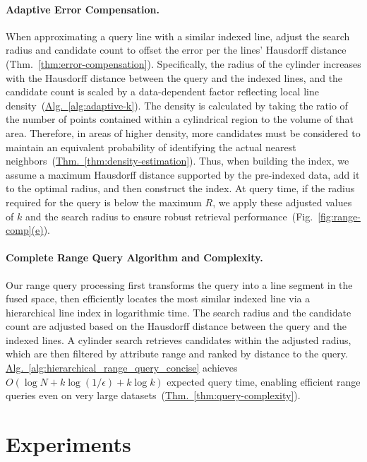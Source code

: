 \documentclass[numbers,sort]{article}
\begin{document}
\paragraph{Adaptive Error Compensation.}When approximating a query line with a similar indexed line, adjust the search radius and candidate count to offset the error per the lines’ Hausdorff distance (Thm.~\ref*{thm:error-compensation}). Specifically, the radius of the cylinder increases with the Hausdorff distance between the query and the indexed lines, and the candidate count is scaled by a data-dependent factor reflecting local line density~(\hyperref[alg:adaptive-k]{Alg.~\ref*{alg:adaptive-k}}). The density is calculated by taking the ratio of the number of points contained within a cylindrical region to the volume of that area. Therefore, in areas of higher density, more candidates must be considered to maintain an equivalent probability of identifying the actual nearest neighbors~(\hyperref[thm:density-estimation]{Thm.~\ref*{thm:density-estimation}}). Thus, when building the index, we assume a maximum Hausdorff distance supported by the pre-indexed data, add it to the optimal radius, and then construct the index. At query time, if the radius required for the query is below the maximum $R$, we apply these adjusted values of $k$ and the search radius to ensure robust retrieval performance~(Fig.~\hyperref[fig:range-comp]{\ref*{fig:range-comp}(e)}).
\paragraph{Complete Range Query Algorithm and Complexity.}Our range query processing first transforms the query into a line segment in the fused space, then efficiently locates the most similar indexed line via a hierarchical line index in logarithmic time. The search radius and the candidate count are adjusted based on the Hausdorff distance between the query and the indexed lines. A cylinder search retrieves candidates within the adjusted radius, which are then filtered by attribute range and ranked by distance to the query. \hyperref[alg:hierarchical_range_query_concise]{Alg.~\ref*{alg:hierarchical_range_query_concise}} achieves $O(\log N + k\log(1/\epsilon) + k\log k)$ expected query time, enabling efficient range queries even on very large datasets~(\hyperref[thm:query-complexity]{Thm.~\ref*{thm:query-complexity}}).

\section{Experiments}
\label{sec:exp}
\end{document}
